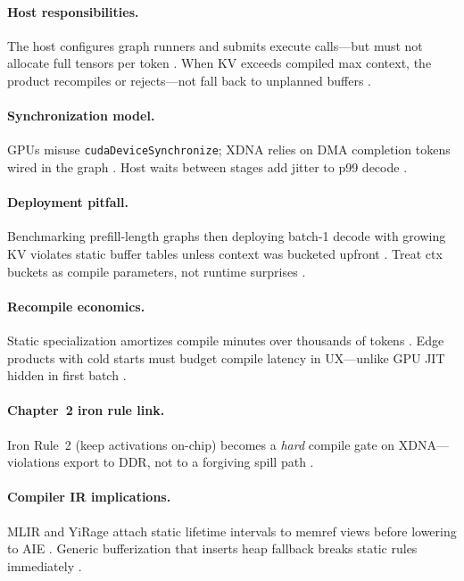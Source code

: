 \paragraph{Host responsibilities.}
The host configures graph runners and submits execute calls---but must not allocate full tensors per token \citep{amd2024xdna}.
When KV exceeds compiled max context, the product recompiles or rejects---not fall back to unplanned buffers \citep{kwon2023vllm,yirage2026}.

\paragraph{Synchronization model.}
GPUs misuse \texttt{cudaDeviceSynchronize}; XDNA relies on DMA completion tokens wired in the graph \citep{amd2024aie,patel2025llminference}.
Host waits between stages add jitter to p99 decode \citep{memoryfloor2026}.

\paragraph{Deployment pitfall.}
Benchmarking prefill-length graphs then deploying batch-1 decode with growing KV violates static buffer tables unless context was bucketed upfront \citep{dao2022flashattention,dao2023flashdecoding}.
Treat ctx buckets as compile parameters, not runtime surprises \citep{kwon2023vllm,yirage2026}.

\paragraph{Recompile economics.}
Static specialization amortizes compile minutes over thousands of tokens \citep{yirage2026,patel2025llminference}.
Edge products with cold starts must budget compile latency in UX---unlike GPU JIT hidden in first batch \citep{taxbreak2026,nvidia2024cudagraphs}.

\paragraph{Chapter~2 iron rule link.}
Iron Rule~2 (keep activations on-chip) becomes a \emph{hard} compile gate on XDNA---violations export to DDR, not to a forgiving spill path \citep{chen2020compilerbasedhardw,memoryfloor2026}.

\paragraph{Compiler IR implications.}
MLIR and YiRage attach static lifetime intervals to memref views before lowering to AIE \citep{yirage2026,chen2020compilerbasedhardw}.
Generic bufferization that inserts heap fallback breaks static rules immediately \citep{memoryfloor2026,kwon2023vllm}.

